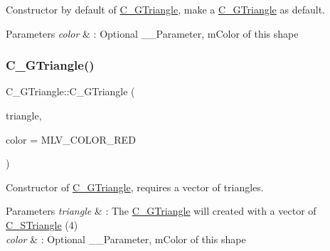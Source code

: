 Constructor by default of \hyperlink{classC__GTriangle}{C\+\_\+\+G\+Triangle}, make a \hyperlink{classC__GTriangle}{C\+\_\+\+G\+Triangle} as default. 


\begin{DoxyParams}{Parameters}
{\em color} & \+: Optional \+\_\+\+\_\+\+Parameter, m\+Color of this shape \\
\hline
\end{DoxyParams}
\mbox{\label{classC__GTriangle_a45212ea205ed1860ac57b048af9fd984}} 
\subsubsection{\texorpdfstring{C\+\_\+\+G\+Triangle()}{C\_GTriangle()}\hspace{0.1cm}{\footnotesize\ttfamily [2/3]}}
{\footnotesize\ttfamily C\+\_\+\+G\+Triangle\+::\+C\+\_\+\+G\+Triangle (\begin{DoxyParamCaption}\item[{const std\+::vector$<$ \hyperlink{classC__STriangle}{C\+\_\+\+S\+Triangle} $>$ \&}]{triangle,  }\item[{M\+L\+V\+\_\+\+Color}]{color = {\ttfamily MLV\+\_\+COLOR\+\_\+RED} }\end{DoxyParamCaption})\hspace{0.3cm}{\ttfamily [explicit]}}



Constructor of \hyperlink{classC__GTriangle}{C\+\_\+\+G\+Triangle}, requires a vector of triangles. 


\begin{DoxyParams}{Parameters}
{\em triangle} & \+: The \hyperlink{classC__GTriangle}{C\+\_\+\+G\+Triangle} will created with a vector of \hyperlink{classC__STriangle}{C\+\_\+\+S\+Triangle} (4) \\
\hline
{\em color} & \+: Optional \+\_\+\+\_\+\+Parameter, m\+Color of this shape \\
\hline
\end{DoxyParams}
\mbox{\label{classC__GTriangle_a2dc558251c2bd2591451e61f0d66714b}} 
